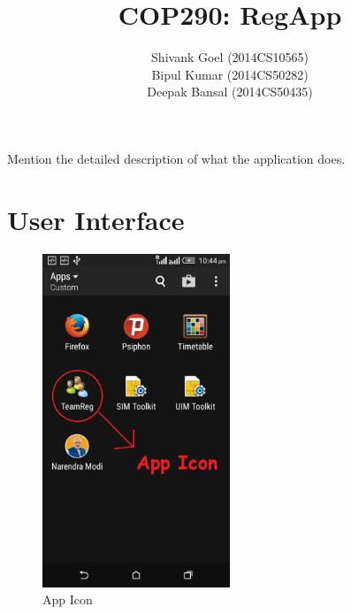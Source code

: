 \documentclass[12pt]{article}
\begin{document}
\title{COP290: RegApp}
\author{Shivank Goel (2014CS10565) \\ Bipul Kumar (2014CS50282) \\ Deepak Bansal (2014CS50435) }
\maketitle

Mention the detailed description of what the application does.



\section{User Interface}

\begin{center}


\begin{figure}[!ht]
	\centering
	\includegraphics[width=0.5\textwidth]{0.png}
	\caption{App Icon}
\end{figure}


\end{center}
\end{document}
